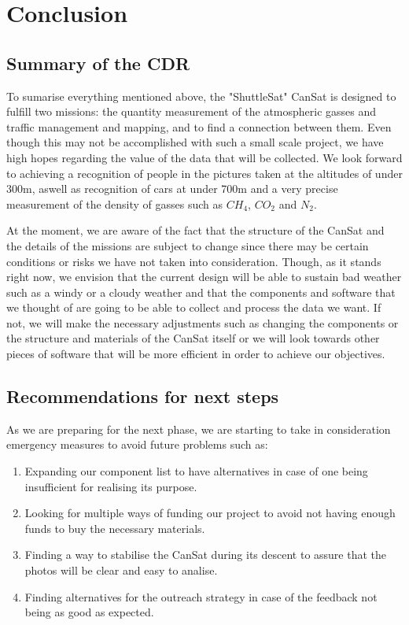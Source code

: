 \documentclass[11pt]{article}
\begin{document}
\section{Conclusion}

\subsection{Summary of the CDR}
\hspace{0.5cm} To sumarise everything mentioned above, the "ShuttleSat" CanSat is designed to fulfill two missions: the quantity measurement of the atmospheric gasses and traffic management and mapping, and to find a connection between them. Even though this may not be accomplished with such a small scale project, we have high hopes regarding the value of the data that will be collected. We look forward to achieving a recognition of people in the pictures taken at the altitudes of under 300m, aswell as recognition of cars at under 700m and a very precise measurement of the density of gasses such as $CH_4$, $CO_2$ and $N_2$.
\newline

At the moment, we are aware of the fact that the structure of the CanSat and the details of the missions are subject to change since there may be certain conditions or risks we have not taken into consideration. Though, as it stands right now, we envision that the current design will be able to sustain bad weather such as a windy or a cloudy weather and that the components and software that we thought of are going to be able to collect and process the data we want. If not, we will make the necessary adjustments such as changing the components or the structure and materials of the CanSat itself or we will look towards other pieces of software that will be more efficient in order to achieve our objectives.



\subsection{Recommendations for next steps}
\hspace{0.5cm} As we are preparing for the next phase, we are starting to take in consideration emergency measures to avoid future problems such as:
\begin{enumerate}
\item Expanding our component list to have alternatives in case of one being insufficient for realising its purpose.
\item Looking for multiple ways of funding our project to avoid not having enough funds to buy the necessary materials.
\item Finding a way to stabilise the CanSat during its descent to assure that the photos will be clear and easy to analise.
\item Finding alternatives for the outreach strategy in case of the feedback not being as good as expected.
\end{enumerate}
\end{document}
